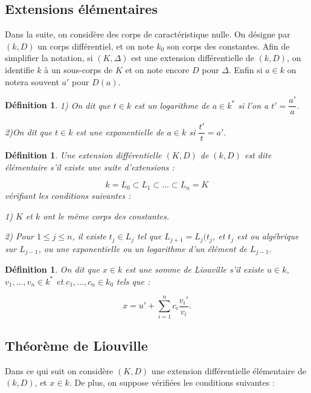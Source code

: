 \documentclass[12pt,a4paper]{report}
\newtheorem{defn}[thm]{\bf D\'efinition}
\begin{document}
\subsection{Extensions élémentaires}

Dans la suite, on considère des corps de caractéristique nulle. On désigne par $(k,D)$ un corps différentiel, et on note $k_{0}$ son corps des constantes. Afin de simplifier la notation, si $(K,\Delta)$ est une extension différentielle de $(k,D)$, on identifie $k$ à un sous-corps de $K$ et on note encore $D$ pour $\Delta$. Enfin si $a\in k$ on notera souvent $a'$ pour $D(a)$.

\begin{defn}\rm
1) On dit que $t \in k$ est un logarithme de $a\in k^{*}$ si l'on a $t'=\dfrac{a'}{a}.$

2)On dit que $t \in k$ est une exponentielle de $a\in k$ si $\dfrac{t'}{t}=a'.$

\end{defn} 

\begin{defn}\rm
Une extension différentielle $(K,D)$ de $(k,D)$ est dite élémentaire s'il existe une suite d'extensions : 

$$k=L_{0} \subset L_{1} \subset ... \subset L_{n}=K$$
vérifiant les conditions suivantes : 

1) $K$ et $k$ ont le même corps des constantes.

2) Pour $1 \leq j\leq n$, il existe $t_{j} \in L_{j}$ tel que $L_{j+1}=L_{j}(t_{j}$, et $t_{j}$ est ou algébrique sur $L_{j-1}$, ou une exponentielle ou un logarithme d'un élément de $L_{j-1}.$
\end{defn}


\begin{defn}\rm
On dit que $x \in k$ est une somme de Liouville s'il existe $u \in k$, $v_{1},...,v_{n} \in k^{*}$ et $c_{1},...,c_{n} \in k_{0}$ tels que : 

$$x=u'+\sum_{i=1}^{n} c_{i} \dfrac{v_{i}'}{v_{i}}.$$

\end{defn}

\subsection{Théorème de Liouville}

Dans ce qui suit on considère $(K,D)$ une extension différentielle élémentaire de $(k,D)$, et $x\in k$. De plus, on suppose vérifiées les conditions suivantes : 
\end{document}

